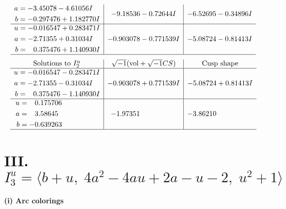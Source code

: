 \documentclass[1p]{elsarticle_modified}
\theoremstyle{definition}
\newcommand{\I}{\sqrt{-1}}
\begin{document}
$$\begin{array}{c|c|c}
\begin{aligned}
a &= -3.45078 - 4.61056 I \\
b &= -0.297476 + 1.182770 I\end{aligned}
 & -9.18536 - 0.72644 I & -6.52695 - 0.34896 I \\ \hline\begin{aligned}
u &= -0.016547 + 0.283471 I \\
a &= -2.71355 + 0.31034 I \\
b &= \phantom{-}0.375476 + 1.140930 I\end{aligned}
 & -0.903078 - 0.771539 I & -5.08724 - 0.81413 I\\
 \hline 
 \end{array}$$\newpage$$\begin{array}{c|c|c}  
\text{Solutions to }I^u_{2}& \I (\text{vol} + \sqrt{-1}CS) & \text{Cusp shape}\\
 \hline 
\begin{aligned}
u &= -0.016547 - 0.283471 I \\
a &= -2.71355 - 0.31034 I \\
b &= \phantom{-}0.375476 - 1.140930 I\end{aligned}
 & -0.903078 + 0.771539 I & -5.08724 + 0.81413 I \\ \hline\begin{aligned}
u &= \phantom{-}0.175706\phantom{ +0.000000I} \\
a &= \phantom{-}3.58645\phantom{ +0.000000I} \\
b &= -0.639263\phantom{ +0.000000I}\end{aligned}
 & -1.97351\phantom{ +0.000000I} & -3.86210\phantom{ +0.000000I}\\
 \hline 
 \end{array}$$\newpage\newpage\renewcommand{\arraystretch}{1}
\centering \section*{III. $I^u_{3}= \langle b+u,\;4 a^2-4 a u+2 a- u-2,\;u^2+1 \rangle$}
\flushleft \textbf{(i) Arc colorings}\\
\end{document}
